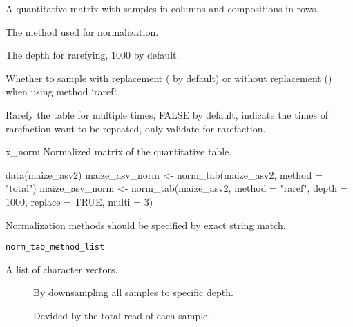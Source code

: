 \documentclass[a4paper]{book}
\begin{document}
\begin{Arguments}
\begin{ldescription}
\item[\code{x}] A quantitative matrix with samples in columns and compositions in
rows.

\item[\code{method}] The method used for normalization.

\item[\code{depth}] The depth for rarefying, 1000 by default.

\item[\code{replace}] Whether to sample with replacement ( by default)
or without replacement () when using method `raref`.

\item[\code{multi}] Rarefy the table for multiple times, FALSE by default, indicate
the times of rarefaction want to be repeated, only validate for rarefaction.
\end{ldescription}
\end{Arguments}
%
\begin{Value}
x\_norm Normalized matrix of the quantitative table.
\end{Value}
%
\begin{Examples}
\begin{ExampleCode}
data(maize_asv2)
maize_asv_norm <- norm_tab(maize_asv2, method = "total")
maize_asv_norm <- norm_tab(maize_asv2, method = "raref", depth = 1000,
replace = TRUE, multi = 3)
\end{ExampleCode}
\end{Examples}
%
\begin{Description}\relax
Normalization methods should be specified by exact string match.
\end{Description}
%
\begin{Usage}
\begin{verbatim}
norm_tab_method_list
\end{verbatim}
\end{Usage}
%
\begin{Format}
A list of character vectors.
\begin{description}

\item[]  By downsampling all samples to specific depth. 
\item[]  Devided by the total read of each sample. 

\end{description}

\end{Format}
\end{document}
